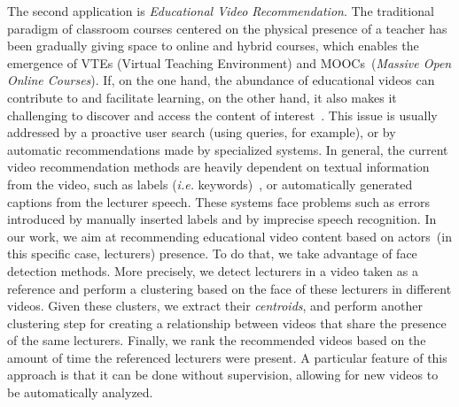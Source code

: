 The second application is \emph{Educational Video Recommendation}.
The traditional paradigm of classroom courses centered on the physical presence of a teacher has been gradually giving space to online and hybrid courses, which enables the emergence of VTEs (Virtual Teaching Environment) and MOOCs~(\textit{Massive Open Online Courses}).
If, on the one hand, the abundance of educational videos can contribute to and facilitate learning, on the other hand, it also makes it challenging to discover and access the content of interest~\cite{dias2017approach}.
This issue is usually addressed by a proactive user search (using queries, for example), or by automatic recommendations made by specialized systems.
In general, the current video recommendation methods are heavily dependent on textual information from the video, such as labels (\textit{i.e.} keywords)~\cite{mahajan2015optimising,omisore2014personalized}, or automatically generated captions \cite{barrere2020utilizaccao} from the lecturer speech.
These systems face problems such as errors introduced by manually inserted labels and by imprecise speech recognition.
In our work, we aim at recommending educational video content based on actors~(in this specific case, lecturers) presence.
To do that, we take advantage of face detection methods.
More precisely, we detect lecturers in a video taken as a reference and perform a clustering based on the face of these lecturers in different videos.
Given these clusters, we extract their \textit{centroids}, and perform another clustering step for creating a relationship between videos that share the presence of the same lecturers.
Finally, we rank the recommended videos based on the amount of time the referenced lecturers were present.
A particular feature of this approach is that it can be done without supervision, allowing for new videos to be automatically analyzed.

